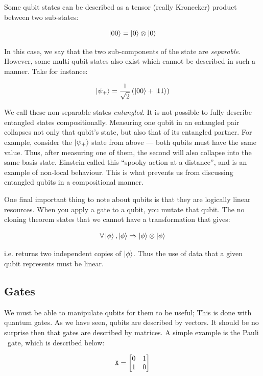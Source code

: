 Some qubit states can be described as a tensor (really Kronecker) product between two sub-states:

$$
    \ket {00} = \ket 0 \otimes \ket 0
$$

\noindent In this case, we say that the two sub-components of the state are \emph{separable}. 
% 
However, some multi-qubit states also exist which cannot be described in such a manner. 
% 
Take for instance:

$$
  \ket {\psi _+} = \frac{1}{\sqrt 2} \left( \ket {00} + \ket{11} \right)
$$

\noindent We call these non-separable states \emph{entangled}. 
% 
It is not possible to fully describe entangled states compositionally.
% 
Measuring one qubit in an entangled pair collapses not only that qubit's state, but also that of its entangled partner. 
% 
For example, consider the $\ket{\psi _+}$ state from above --- both qubits must have the same value.
% 
Thus, after measuring one of them, the second will also collapse into the same basis state.
% 
Einstein called this ``spooky action at a distance'', and is an example of non-local behaviour. 
% 
This is what prevents us from discussing entangled qubits in a compositional manner.


One final important thing to note about qubits is that they are logically linear resources.
% 
When you apply a gate to a qubit, you mutate that qubit. 
% 
The no cloning theorem \cite{Wootters_1982_NoCloning} states that we cannot have a transformation that gives:

$$
  \forall \ket\phi, \ket{\phi} \Rightarrow \ket{\phi} \otimes \ket{\phi}
$$

\noindent i.e. returns two independent copies of $\ket{\phi}$. 
% 
Thus the use of data that a given qubit represents must be linear.

\subsection{Gates}
We must be able to manipulate qubits for them to be useful; This is done with quantum gates.
% 
As we have seen, qubits are described by vectors. 
% 
It should be no surprise then that gates are described by matrices.
% 
A simple example is the Pauli \X\ gate, which is described below:

$$
  \texttt{X} = \begin{bmatrix}
    0 & 1 \\
    1 & 0
  \end{bmatrix}
$$

